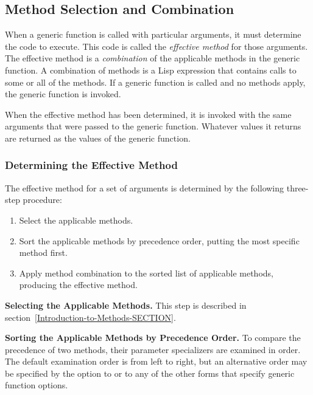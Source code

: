 \subsection{Method Selection and Combination}
\label{Method-Selection-and-Combination-SECTION}

When a generic function is called with particular arguments, it must
determine the code to execute.  This code is called the \emph{effective
method\/} for those arguments.  The effective method is a \emph{
combination\/} of the applicable methods in the generic function.  A
combination of methods is a Lisp expression that contains calls to some or
all of the methods.  If a generic function is
called and no methods apply, the generic function 
 is invoked.

When the effective method has been determined, it is invoked with the same
arguments that were passed to the generic function.  Whatever values it
returns are returned as the values of the generic function.

\subsubsection{Determining the Effective Method}
\label{Determining-the-Effective-Method-SECTION}

The effective method for a set of
arguments is determined by the following three-step procedure:

\begin{enumerate}

\item Select the applicable methods.

\item Sort the applicable methods by precedence order, putting
the most specific method first.

\item Apply method combination to the sorted list of
applicable methods, producing the effective method.

\end{enumerate}

\textbf{Selecting the Applicable Methods.}
This step is described in section~\ref{Introduction-to-Methods-SECTION}.


\textbf{Sorting the Applicable Methods by Precedence Order.}
To compare the precedence of two methods, their parameter specializers
are examined in order.  The default examination order is from left to
right, but an alternative order may be specified by the 
 option to  or to any of
the other forms that specify generic function options.


